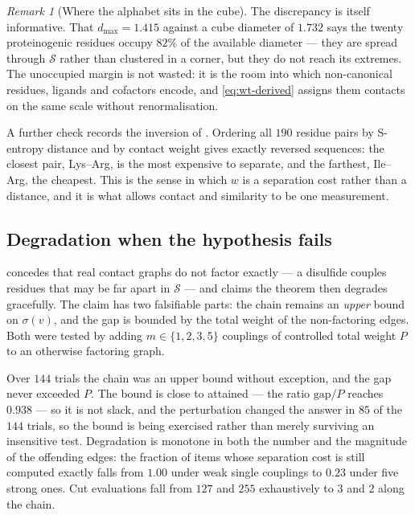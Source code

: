 \documentclass[11pt,twocolumn,a4paper]{article}
\theoremstyle{thmstyle}
\theoremstyle{definition}
\theoremstyle{remark}
\newtheorem{remark}[theorem]{Remark}
\newcommand{\wt}{w}
\newcommand{\str}{\sigma}
\newcommand{\gapv}{\mathrm{gap}}
\newcommand{\Sspace}{\mathcal{S}}
\begin{document}
\begin{remark}[Where the alphabet sits in the cube]
\label{rem:alphabet-occupancy}
The discrepancy is itself informative. That $d_{\max} = 1.415$ against a
cube diameter of $1.732$ says the twenty proteinogenic residues occupy
$82\%$ of the available diameter --- they are spread through
$\Sspace$ rather than clustered in a corner, but they do not reach its
extremes. The unoccupied margin is not wasted: it is the room into
which non-canonical residues, ligands and cofactors encode, and
\eqref{eq:wt-derived} assigns them contacts on the same scale without
renormalisation.
\end{remark}

A further check records the inversion of . Ordering
all $190$ residue pairs by S-entropy distance and by contact weight
gives exactly reversed sequences: the closest pair, Lys--Arg, is the
most expensive to separate, and the farthest, Ile--Arg, the cheapest.
This is the sense in which $\wt$ is a separation cost rather than a
distance, and it is what allows contact and similarity to be one
measurement.

\subsection{Degradation when the hypothesis fails}
\label{sec:val-c}

 concedes that real contact graphs do not
factor exactly --- a disulfide couples residues that may be far apart in
$\Sspace$ --- and claims the theorem then degrades gracefully. The claim
has two falsifiable parts: the chain remains an \emph{upper} bound on
$\str(v)$, and the gap is bounded by the total weight of the
non-factoring edges. Both were tested by adding $m \in \{1,2,3,5\}$
couplings of controlled total weight $P$ to an otherwise factoring
graph.

Over $144$ trials the chain was an upper bound without exception, and
the gap never exceeded $P$. The bound is close to attained --- the ratio
$\gapv/P$ reaches $0.938$ --- so it is not slack, and the perturbation
changed the answer in $85$ of the $144$ trials, so the bound is being
exercised rather than merely surviving an insensitive test. Degradation
is monotone in both the number and the magnitude of the offending edges:
the fraction of items whose separation cost is still computed exactly
falls from $1.00$ under weak single couplings to $0.23$ under five
strong ones. Cut evaluations fall from $127$ and $255$ exhaustively to
$3$ and $2$ along the chain.
\end{document}

